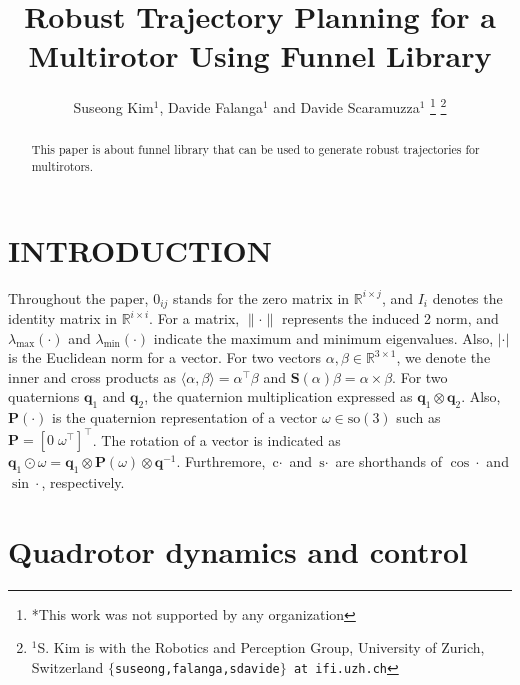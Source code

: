 \documentclass[letterpaper, 10 pt, conference]{ieeeconf}  %
\title{\LARGE \bf
Robust Trajectory Planning for a Multirotor Using Funnel Library
}
\author{Suseong Kim$^{1}$, Davide Falanga$^{1}$ and Davide Scaramuzza$^{1}$%
\thanks{*This work was not supported by any organization}%
\thanks{$^{1}$S. Kim is with the Robotics and Perception Group, University of Zurich, Switzerland
        {\tt\small $\{$suseong,falanga,sdavide$\}$ at ifi.uzh.ch}}%
}
\begin{document}
\maketitle
\thispagestyle{empty}
\pagestyle{empty}


\begin{abstract}

This paper is about funnel library that can be used to generate robust trajectories for multirotors.

\end{abstract}


\section{INTRODUCTION}

Throughout the paper, $0_{ij}$ stands for the zero matrix in $\mathbb{R}^{i\times j}$, and $I_i$ denotes the identity matrix in $\mathbb{R}^{i\times i}$. 
For a matrix, $\|\cdot\|$ represents the induced 2 norm, and $\lambda_{\max}(\cdot)$ and $\lambda_{\min}(\cdot)$ indicate the maximum and minimum eigenvalues.
Also, $|\cdot|$ is the Euclidean norm for a vector. 
For two vectors $\alpha,\beta \in \mathbb{R}^{3\times 1}$, 
we denote the inner and cross products as $\langle \alpha,\beta\rangle = \alpha^\top \beta$ and $\textbf{S}(\alpha)\beta = \alpha \times \beta$. 
For two quaternions $\mathbf{q}_1$ and $\mathbf{q}_2$, the quaternion multiplication expressed as $\mathbf{q}_1\otimes\mathbf{q}_2$. 
Also, $\textbf{P}(\cdot)$ is the quaternion representation of a vector $\omega\in\text{so}(3)$ such as $\textbf{P} = [0\;\omega^\top]^\top$. 
The rotation of a vector is indicated as $\mathbf{q}_1\odot\omega = \textbf{q}_1\otimes\textbf{P}(\omega)\otimes\textbf{q}^{-1}$. 
Furthremore, $\text{c}\cdot$ and $\text{s}\cdot$ are shorthands of $\cos\cdot$ and $\sin\cdot$, respectively.

\section{Quadrotor dynamics and control}
\end{document}
